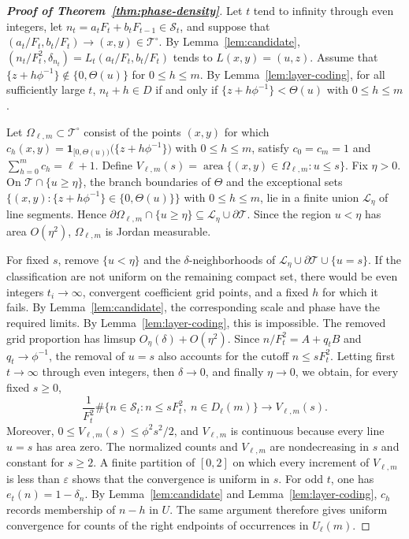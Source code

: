 \documentclass[11pt]{amsart}
\theoremstyle{definition}
\newcommand{\Tcal}{\mathcal T}
\newcommand{\Scal}{\mathcal S}
\begin{document}
\begin{proof}[\bf Proof of Theorem~\ref{thm:phase-density}]
Let $t$ tend to infinity through even integers, let
$n_t=a_tF_t+b_tF_{t-1}\in\Scal_t$, and suppose that
$(a_t/F_t,b_t/F_t)\to(x,y)\in\Tcal^\circ$. By
Lemma~\ref{lem:candidate},
$(n_t/F_t^2,\delta_{n_t})=L_t(a_t/F_t,b_t/F_t)$ tends to
$L(x,y)=(u,z)$.
Assume that $\{z+h\phi^{-1}\}\notin\{0,\Theta(u)\}$ for
$0\leq h\leq m$. By Lemma~\ref{lem:layer-coding}, for all sufficiently
large $t$, $n_t+h\in D$ if and only if $\{z+h\phi^{-1}\}<\Theta(u)$ with $0\leq h\leq m$.

Let $\Omega_{\ell,m}\subset\Tcal^\circ$ consist of the points $(x,y)$
for which $c_h(x,y)=\boldsymbol1_{[0,\Theta(u))}\bigl(\{z+h\phi^{-1}\}\bigr)$ with $0\leq h\leq m$, satisfy $c_0=c_m=1$ and $\sum_{h=0}^m c_h=\ell+1$. Define $V_{\ell,m}(s)=\operatorname{area}\{(x,y)\in\Omega_{\ell,m}:u\leq s\}$.
Fix $\eta>0$. On $\Tcal\cap\{u\geq\eta\}$, the branch boundaries of
$\Theta$ and the exceptional sets $\{(x,y):\{z+h\phi^{-1}\}\in\{0,\Theta(u)\}\}$ with $0\leq h\leq m$, lie in a finite union $\mathcal L_\eta$ of line segments. Hence $\partial\Omega_{\ell,m}\cap\{u\geq\eta\}\subseteq\mathcal L_\eta\cup\partial\Tcal$.
Since the region $u<\eta$ has area $O(\eta^2)$,
$\Omega_{\ell,m}$ is Jordan measurable.

For fixed $s$, remove $\{u<\eta\}$ and the $\delta$-neighborhoods of
$\mathcal L_\eta\cup\partial\Tcal\cup\{u=s\}$. If the classification are not uniform on the remaining compact set, there would be even
integers $t_i\to\infty$, convergent coefficient grid points, and a fixed
$h$ for which it fails. By Lemma~\ref{lem:candidate}, the corresponding
scale and phase have the required limits. By
Lemma~\ref{lem:layer-coding}, this is impossible. The removed grid
proportion has limsup $O_\eta(\delta)+O(\eta^2)$. Since
$n/F_t^2=A+q_tB$ and $q_t\to\phi^{-1}$, the removal of $u=s$ also
accounts for the cutoff $n\leq sF_t^2$. Letting first $t\to\infty$ through even integers, then
$\delta\to0$, and finally $\eta\to0$, we obtain, for every fixed
$s\geq0$,
\[
\frac1{F_t^2}\#\{n\in\Scal_t:n\leq sF_t^2,\ 
n\in D_\ell(m)\}\longrightarrow V_{\ell,m}(s).
\]
Moreover, $0\leq V_{\ell,m}(s)\leq\phi^2s^2/2$, and $V_{\ell,m}$ is
continuous because every line $u=s$ has area zero. The normalized
counts and $V_{\ell,m}$ are nondecreasing in $s$ and constant for
$s\geq2$. A finite partition of $[0,2]$ on which every increment of
$V_{\ell,m}$ is less than $\varepsilon$ shows that the convergence is
uniform in $s$. For odd $t$, one has $e_t(n)=1-\delta_n$. By
Lemma~\ref{lem:candidate} and Lemma~\ref{lem:layer-coding}, $c_h$
records membership of $n-h$ in $U$. The same argument therefore gives
uniform convergence for counts of the right endpoints of occurrences
in $U_\ell(m)$.


\end{proof}
\end{document}
